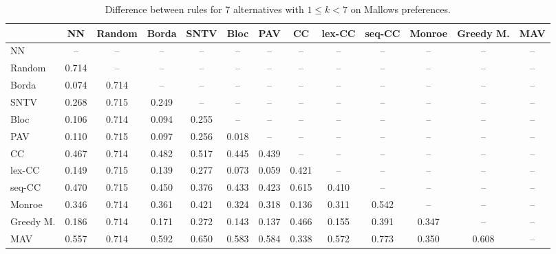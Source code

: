 
\begin{table*}[htbp]
\centering
\begin{tabular}{lcccccccccccc}
\toprule
 & NN & Random & Borda & SNTV & Bloc & PAV & CC & lex-CC & seq-CC & Monroe & Greedy M. & MAV \\
\midrule
NN & -- & -- & -- & -- & -- & -- & -- & -- & -- & -- & -- & -- \\
Random & \cellcolor{blue!71} 0.714 & -- & -- & -- & -- & -- & -- & -- & -- & -- & -- & -- \\
Borda & \cellcolor{blue!7} 0.074 & \cellcolor{blue!71} 0.714 & -- & -- & -- & -- & -- & -- & -- & -- & -- & -- \\
SNTV & \cellcolor{blue!26} 0.268 & \cellcolor{blue!71} 0.715 & \cellcolor{blue!24} 0.249 & -- & -- & -- & -- & -- & -- & -- & -- & -- \\
Bloc & \cellcolor{blue!10} 0.106 & \cellcolor{blue!71} 0.714 & \cellcolor{blue!9} 0.094 & \cellcolor{blue!25} 0.255 & -- & -- & -- & -- & -- & -- & -- & -- \\
PAV & \cellcolor{blue!11} 0.110 & \cellcolor{blue!71} 0.715 & \cellcolor{blue!9} 0.097 & \cellcolor{blue!25} 0.256 & \cellcolor{blue!1} 0.018 & -- & -- & -- & -- & -- & -- & -- \\
CC & \cellcolor{blue!46} 0.467 & \cellcolor{blue!71} 0.714 & \cellcolor{blue!48} 0.482 & \cellcolor{blue!51} 0.517 & \cellcolor{blue!44} 0.445 & \cellcolor{blue!43} 0.439 & -- & -- & -- & -- & -- & -- \\
lex-CC & \cellcolor{blue!14} 0.149 & \cellcolor{blue!71} 0.715 & \cellcolor{blue!13} 0.139 & \cellcolor{blue!27} 0.277 & \cellcolor{blue!7} 0.073 & \cellcolor{blue!5} 0.059 & \cellcolor{blue!42} 0.421 & -- & -- & -- & -- & -- \\
seq-CC & \cellcolor{blue!47} 0.470 & \cellcolor{blue!71} 0.715 & \cellcolor{blue!45} 0.450 & \cellcolor{blue!37} 0.376 & \cellcolor{blue!43} 0.433 & \cellcolor{blue!42} 0.423 & \cellcolor{blue!61} 0.615 & \cellcolor{blue!41} 0.410 & -- & -- & -- & -- \\
Monroe & \cellcolor{blue!34} 0.346 & \cellcolor{blue!71} 0.714 & \cellcolor{blue!36} 0.361 & \cellcolor{blue!42} 0.421 & \cellcolor{blue!32} 0.324 & \cellcolor{blue!31} 0.318 & \cellcolor{blue!13} 0.136 & \cellcolor{blue!31} 0.311 & \cellcolor{blue!54} 0.542 & -- & -- & -- \\
Greedy M. & \cellcolor{blue!18} 0.186 & \cellcolor{blue!71} 0.714 & \cellcolor{blue!17} 0.171 & \cellcolor{blue!27} 0.272 & \cellcolor{blue!14} 0.143 & \cellcolor{blue!13} 0.137 & \cellcolor{blue!46} 0.466 & \cellcolor{blue!15} 0.155 & \cellcolor{blue!39} 0.391 & \cellcolor{blue!34} 0.347 & -- & -- \\
MAV & \cellcolor{blue!55} 0.557 & \cellcolor{blue!71} 0.714 & \cellcolor{blue!59} 0.592 & \cellcolor{blue!65} 0.650 & \cellcolor{blue!58} 0.583 & \cellcolor{blue!58} 0.584 & \cellcolor{blue!33} 0.338 & \cellcolor{blue!57} 0.572 & \cellcolor{blue!77} 0.773 & \cellcolor{blue!35} 0.350 & \cellcolor{blue!60} 0.608 & -- \\
\bottomrule
\end{tabular}

\caption{Difference between rules for 7 alternatives with $1 \leq k < 7$ on Mallows preferences.}
\label{tab:rule_distance_heatmap-m=[7]-pref_dist=MALLOWS-RELPHI-R}
\end{table*}
    